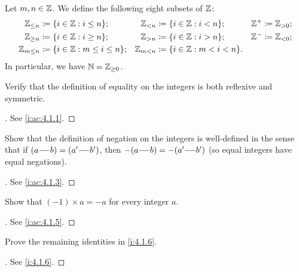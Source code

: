 \begin{ac}\label{i:ac:4.1.9}
  Let \(m, n \in \mathbb{Z}\).
  We define the following eight subsets of \(\mathbb{Z}\):
  \begin{align*}
    \Z_{\leq n}   & \coloneqq \set{i \in \Z : i \leq n};        & \Z_{< n}   & \coloneqq \set{i \in \Z : i < n};     & \Z^+ & \coloneqq \Z_{> 0}; \\
    \Z_{\geq n}   & \coloneqq \set{i \in \Z : i \geq n};        & \Z_{> n}   & \coloneqq \set{i \in \Z : i > n};     & \Z^- & \coloneqq \Z_{< 0}; \\
    \Z_{m \leq n} & \coloneqq \set{i \in \Z : m \leq i \leq n}; & \Z_{m < n} & \coloneqq \set{i \in \Z : m < i < n}. &      &
  \end{align*}
  In particular, we have \(\mathbb{N} = \mathbb{Z}_{\geq 0}\).
\end{ac}

\exercisesection

\begin{ex}\label{i:ex:4.1.1}
  Verify that the definition of equality on the integers is both reflexive and symmetric.
\end{ex}

\begin{proof}[]
  See \cref{i:ac:4.1.1}.
\end{proof}

\begin{ex}\label{i:ex:4.1.2}
  Show that the definition of negation on the integers is well-defined in the sense that if \((a {-}\!{-} b) = (a' {-}\!{-} b')\), then \(-(a {-}\!{-} b) = -(a' {-}\!{-} b')\)
  (so equal integers have equal negations).
\end{ex}

\begin{proof}[]
  See \cref{i:ac:4.1.3}.
\end{proof}

\begin{ex}\label{i:ex:4.1.3}
  Show that \((-1) \times a = -a\) for every integer \(a\).
\end{ex}

\begin{proof}[]
  See \cref{i:ac:4.1.5}.
\end{proof}

\begin{ex}\label{i:ex:4.1.4}
  Prove the remaining identities in \cref{i:4.1.6}.
\end{ex}

\begin{proof}[]
  See \cref{i:4.1.6}.
\end{proof}

